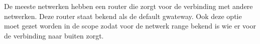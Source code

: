 De meeste netwerken hebben een router die zorgt voor de verbinding met andere netwerken. Deze router staat bekend als de default gwateway. Ook deze optie moet gezet worden in de scope zodat voor de netwerk range bekend is wie er voor de verbinding naar buiten zorgt.
